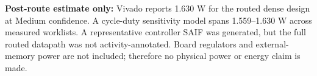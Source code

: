 \noindent\textbf{Post-route estimate only:} Vivado reports 1.630 W for the routed dense design at Medium confidence. A cycle-duty sensitivity model spans 1.559--1.630 W across measured worklists. A representative controller SAIF was generated, but the full routed datapath was not activity-annotated. Board regulators and external-memory power are not included; therefore no physical power or energy claim is made.
